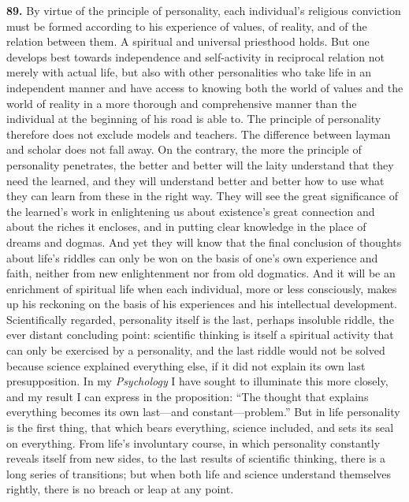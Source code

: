 \documentclass[12pt,a4paper]{book}
\newcommand{\opage}[1]{\marginnote{\footnotesize\textit{[#1]}}}
\begin{document}
\noindent\textbf{89.} By virtue of the principle of personality, each individual's religious conviction
must be formed according to his experience of values, of reality, and of the relation between them. A
spiritual and universal priesthood holds. But one develops best 
\opage{205}towards independence and self-activity
in reciprocal relation not merely with actual life, but also with other personalities who take life in an
independent manner and have access to knowing both the world of values and the world of reality in a more
thorough and comprehensive manner than the individual at the beginning of his road is able to. The
principle of personality therefore does not exclude models and teachers. The difference between layman and
scholar does not fall away. On the contrary, the more the principle of personality penetrates, the better
and better will the laity understand that they need the learned, and they will understand better and
better how to use what they can learn from these in the right way. They will see the great significance of
the learned's work in enlightening us about existence's great connection and about the riches it encloses,
and in putting clear knowledge in the place of dreams and dogmas. And yet they will know that the final
conclusion of thoughts about life's riddles can only be won on the basis of one's own experience and faith,
neither from new enlightenment nor from old dogmatics. And it will be an enrichment of spiritual life when
each individual, more or less consciously, makes up his reckoning on the basis of his experiences and his
intellectual development. Scientifically regarded, personality itself is the last, perhaps insoluble riddle,
the ever distant concluding point: scientific thinking is itself a spiritual activity that can only be
exercised by a personality, and the last riddle would not be solved because science explained everything
else, if it did not explain its own last presupposition. In my \emph{Psychology} I have sought to illuminate
this more closely, and my result I can express in the proposition: ``The thought that explains everything
becomes its own last---and constant---problem.'' But in life personality is the first thing, that which bears
everything, science included, and sets its seal on everything. From life's involuntary course, in which
personality constantly reveals itself from new sides, to the last results of scientific thinking, there is a
long series of transitions; but when both life and science understand themselves rightly, there is no breach
or leap at any point.
\end{document}
